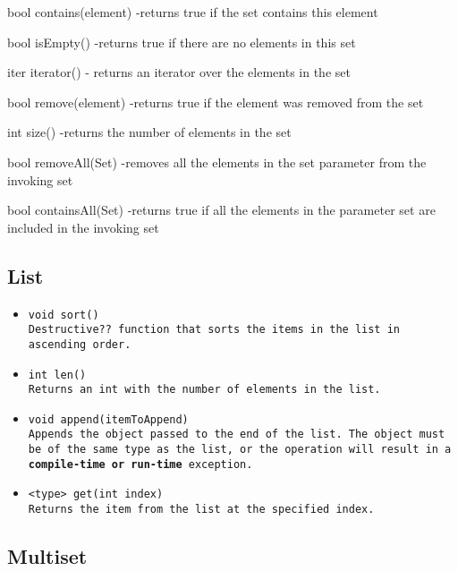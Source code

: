 \documentclass{book}
\begin{document}
bool contains(element)
-returns true if the set contains this element

bool isEmpty()
-returns true if there are no elements in this set

iter iterator()
- returns an iterator over the elements in the set

bool remove(element)
-returns true if the element was removed from the set

int size()
-returns the number of elements in the set

bool removeAll(Set) 
-removes all the elements in the set parameter from the invoking set

bool containsAll(Set) 
-returns true if all the elements in the parameter set are included in the invoking set

\subsection{List} %
\label{sub:list}

\begin{itemize}

\item \tt void sort() \rm \\

Destructive?? function that sorts the items in the list in ascending order.

\item \tt int len() \rm \\

Returns an int with the number of elements in the list.

\item \tt void append(itemToAppend) \rm \\

Appends the object passed to the end of the list. The object must be of the same
type as the list, or the operation will result in a \textbf{compile-time or
run-time} exception.

\item \tt <type> get(int index) \rm \\

Returns the item from the list at the specified index.

\end{itemize}



\subsection{Multiset} %
\label{sub:multiset}
\end{document}
